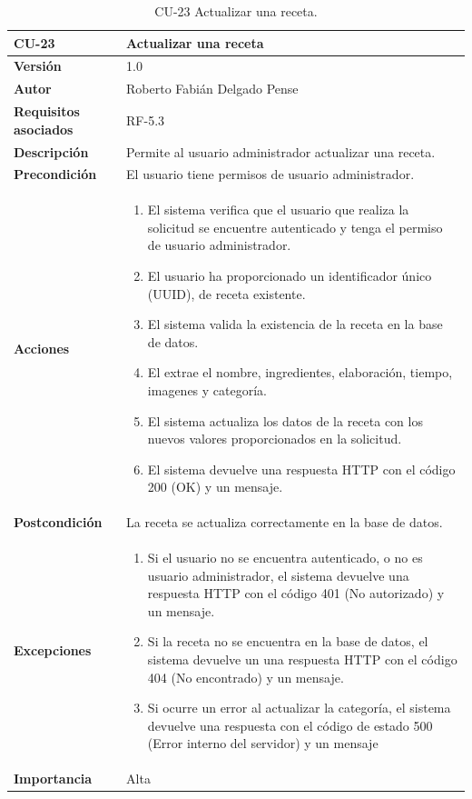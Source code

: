 \begin{table}[p]
	\centering
	\begin{tabularx}{\linewidth}{ p{} p{} }
		\toprule
		\textbf{CU-23}    & \textbf{Actualizar una receta}\\
		\toprule
		\textbf{Versión}              & 1.0    \\
		\textbf{Autor}                & Roberto Fabián Delgado Pense \\
		\textbf{Requisitos asociados} & RF-5.3 \\ 
		\textbf{Descripción}          & Permite al usuario administrador actualizar una receta. \\
		\textbf{Precondición}         & El usuario tiene permisos de usuario administrador. \\
		\textbf{Acciones}             &
		\begin{enumerate}
			\def\labelenumi{\arabic{enumi}.}
			\tightlist
                \item El sistema verifica que el usuario que realiza la solicitud se encuentre autenticado y tenga el permiso de usuario administrador.
			\item El usuario ha proporcionado un identificador único (UUID), de receta existente.
			\item El sistema valida la existencia de la receta en la base de datos.
                \item El extrae el nombre, ingredientes, elaboración, tiempo, imagenes y categoría.
                \item El sistema actualiza los datos de la receta con los nuevos valores proporcionados en la solicitud.
                \item El sistema devuelve una respuesta HTTP con el código 200 (OK) y un mensaje.
            \end{enumerate}\\
		\textbf{Postcondición}        & La receta se actualiza correctamente en la base de datos.\\
		\textbf{Excepciones}          & 
            \begin{enumerate}
			\def\labelenumi{\arabic{enumi}.}
			\tightlist
   			\item Si el usuario no se encuentra autenticado, o no es usuario administrador, el sistema devuelve una                 respuesta HTTP con el código 401 (No autorizado) y un mensaje.
                \item   Si la receta no se encuentra en la base de datos, el sistema devuelve un                           una respuesta HTTP con el código 404 (No encontrado) y un mensaje. 
                \item Si ocurre un error al actualizar la categoría, el sistema devuelve una respuesta con el código de estado 500 (Error interno del servidor) y un mensaje
            \end{enumerate}\\
		\textbf{Importancia}          & Alta \\
		\bottomrule
	\end{tabularx}
	\caption{CU-23 Actualizar una receta.}
\end{table}

